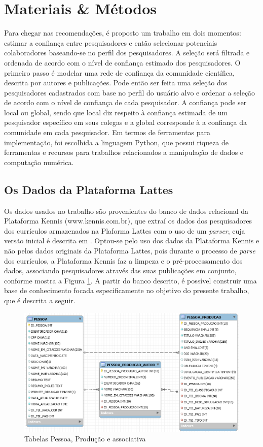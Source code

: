 \documentclass[12pt]{article}
\begin{document}
\section{Materiais \& Métodos}

Para chegar nas recomendações, é proposto um trabalho em dois momentos: estimar a confiança entre pesquisadores e então
selecionar potenciais colaboradores baseando-se no perfil dos pesquisadores. A seleção será filtrada e ordenada de acordo com o 
nível de confiança estimado dos pesquisadores. O primeiro passo é modelar uma rede de confiança da comunidade científica, descrita 
por autores e publicações. Pode então ser feita uma seleção dos pesquisadores cadastrados com base no perfil do usuário alvo e 
ordenar a seleção de acordo com o nível de confiança de cada pesquisador. A confiança pode ser local ou global, sendo que local diz 
respeito à confiança estimada de um pesquisador específico em seus colegas e a global corresponde à a confiança da comunidade em 
cada pesquisador. Em termos de ferramentas para implementação, foi escolhida a linguagem Python, que possui riqueza de ferramentas 
e recursos para trabalhos relacionados a manipulação de dados e computação numérica.%

\subsection{Os Dados da Plataforma Lattes}

Os dados usados no trabalho são provenientes do banco de dados relacional da Plataforma Kennis (www.kennis.com.br), que extraí os dados dos pesquisadores dos currículos armazenados na Plaforma Lattes com o uso de um \textit{parser}, cuja versão inicial é descrita em \cite{prass2019parser}. Optou-se pelo uso dos dados da Plataforma Kennis e não pelos dados originais da Plataforma Lattes, pois durante o processo de \textit{parse} dos currículos, a Plataforma Kennis faz a limpeza e o pré-processamento dos dados, associando pesquisadores através das suas publicações em conjunto, conforme mostra a Figura \ref{fig:database}. A partir do banco descrito, é 
possível construir uma base de conhecimento focada especificamente no objetivo do presente trabalho, que é descrita a seguir.

\begin{center}
  \begin{figure}[ht]
    \centering
    \includegraphics[width=.8\textwidth]{database.png}
    \caption{Tabelas Pessoa, Produção e associativa \cite{prass2019parser}}
    \label{fig:database}
  \end{figure}
 \end{center}
\end{document}

